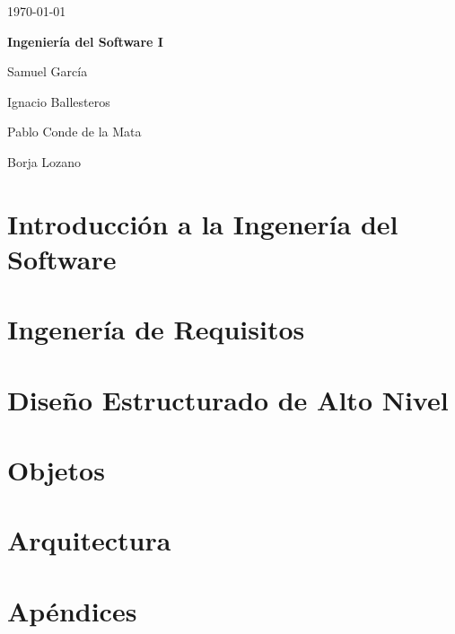 \documentclass[12pt,a4paper]{report}
\begin{document}
\begin{titlepage}
	\hfill \today

	\vspace{.2\textheight}

	\begin{center}
		{\huge\bfseries Ingeniería del Software I\par}
		\vspace{3cm}
		Samuel García \par
		Ignacio Ballesteros \par
                Pablo Conde de la Mata \par
                Borja Lozano \par
	\end{center}

\end{titlepage}\tableofcontents


\chapter{Introducción a la Ingenería del Software}
\label{chap:introduccion}

\chapter{Ingenería de Requisitos}
\label{chap:requisitos}


\chapter{Diseño Estructurado de Alto Nivel}
\label{chap:estructurado}


\chapter{Objetos}
\label{chap:objetos}


\chapter{Arquitectura}
\label{chap:arquitectura}



\chapter{Apéndices}
\end{document}
